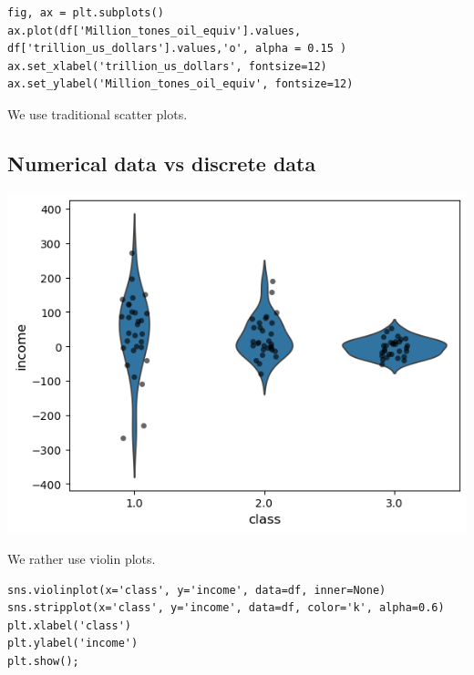 \documentclass[24pt]{article}
\begin{document}
\begin{lstlisting}
fig, ax = plt.subplots()
ax.plot(df['Million_tones_oil_equiv'].values, df['trillion_us_dollars'].values,'o', alpha = 0.15 )
ax.set_xlabel('trillion_us_dollars', fontsize=12)
ax.set_ylabel('Million_tones_oil_equiv', fontsize=12)
\end{lstlisting}



We use traditional scatter plots.


\subsection{Numerical data vs discrete data}
\begin{center}
\includegraphics[scale = 0.6]{numeric_vs_discrete.png}
\end{center}

We rather use violin plots.
\begin{lstlisting}
sns.violinplot(x='class', y='income', data=df, inner=None)
sns.stripplot(x='class', y='income', data=df, color='k', alpha=0.6)
plt.xlabel('class')
plt.ylabel('income')
plt.show();
\end{lstlisting}
\end{document}
